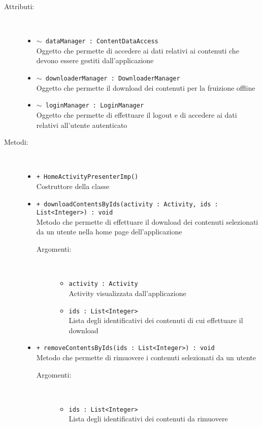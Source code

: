 \documentclass[../Tesi.tex]{subfiles}
\begin{document}
		\begin{description}
			\item[Attributi:] \
			\begin{itemize}
				\item \texttt{$\sim$ dataManager : ContentDataAccess}\\
				Oggetto che permette di accedere ai dati relativi ai contenuti che devono essere gestiti dall'applicazione

				\item \texttt{$\sim$ downloaderManager : DownloaderManager}\\
				Oggetto che permette il download dei contenuti per la fruizione offline

				\item \texttt{$\sim$ loginManager : LoginManager}\\
				Oggetto che permette di effettuare il logout e di accedere ai dati relativi all'utente autenticato
			\end{itemize}

			\item[Metodi:] \
			\begin{itemize}
				\item \texttt{+ HomeActivityPresenterImp()}\\
				Costruttore della classe 
				
				\item \texttt{+ downloadContentsByIds(activity : Activity, ids : \\List<Integer>) : void}\\
				Metodo che permette di effettuare il download dei contenuti selezionati da un utente nella home page dell'applicazione
				\begin{description}
					\item[Argomenti:] \
					\begin{itemize}
						\item \texttt{activity : Activity}\\
						Activity visualizzata dall'applicazione

						\item \texttt{ids : List<Integer>}\\
						Lista degli identificativi dei contenuti di cui effettuare il download
					\end{itemize}
				\end{description}

				\item \texttt{+ removeContentsByIds(ids : List<Integer>) : void}\\
				Metodo che permette di rimuovere i contenuti selezionati da un utente
				\begin{description}
					\item[Argomenti:] \
					\begin{itemize}
						\item \texttt{ids : List<Integer>}\\
						Lista degli identificativi dei contenuti da rimuovere
					\end{itemize}
				\end{description}


\end{itemize}
\end{description}
\end{document}
